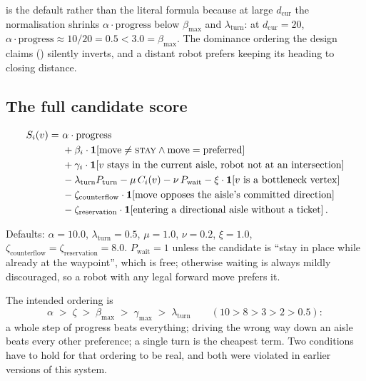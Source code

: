 \begin{caveat}
 is the default rather than the literal formula because at large
$d_{\mathrm{cur}}$ the  normalisation shrinks
$\alpha \cdot \mathrm{progress}$ below $\beta_{\max}$ and
$\lambda_{\mathrm{turn}}$: at $d_{\mathrm{cur}} = 20$,
$\alpha \cdot \mathrm{progress} \approx 10/20 = 0.5 < 3.0 = \beta_{\max}$. The
dominance ordering the design claims () silently inverts,
and a distant robot prefers keeping its heading to closing distance.
\end{caveat}

\subsection{The full candidate score}
\label{sec:score-full}

\begin{align}
  S_i(v) = \ & \alpha \cdot \mathrm{progress} \nonumber\\
    &+ \beta_i \cdot \mathbf{1}\!\left[\text{move} \neq \textsc{stay} \wedge \text{move} = \text{preferred}\right] \nonumber\\
    &+ \gamma_i \cdot \mathbf{1}\!\left[\text{$v$ stays in the current aisle, robot not at an intersection}\right] \nonumber\\
    &- \lambda_{\mathrm{turn}} P_{\mathrm{turn}}
      - \mu\, C_i(v)
      - \nu\, P_{\mathrm{wait}}
      - \xi \cdot \mathbf{1}\!\left[\text{$v$ is a bottleneck vertex}\right] \nonumber\\
    &- \zeta_{\mathrm{counterflow}} \cdot \mathbf{1}\!\left[\text{move opposes the aisle's committed direction}\right] \nonumber\\
    &- \zeta_{\mathrm{reservation}} \cdot \mathbf{1}\!\left[\text{entering a directional aisle without a ticket}\right].
  \label{eq:score}
\end{align}

Defaults: $\alpha = 10.0$, $\lambda_{\mathrm{turn}} = 0.5$, $\mu = 1.0$,
$\nu = 0.2$, $\xi = 1.0$, $\zeta_{\mathrm{counterflow}} =
\zeta_{\mathrm{reservation}} = 8.0$. $P_{\mathrm{wait}} = 1$ unless the
candidate is ``stay in place while already at the waypoint'', which is free;
otherwise waiting is always mildly discouraged, so a robot with any legal
forward move prefers it.

The intended ordering is
\begin{equation}
  \alpha \;>\; \zeta \;>\; \beta_{\max} \;>\; \gamma_{\max} \;>\; \lambda_{\mathrm{turn}}
  \qquad (10 > 8 > 3 > 2 > 0.5):
  \label{eq:ordering}
\end{equation}
a whole step of progress beats everything; driving the wrong way down an aisle
beats every other preference; a single turn is the cheapest term. Two
conditions have to hold for that ordering to be real, and both were violated in
earlier versions of this system.

